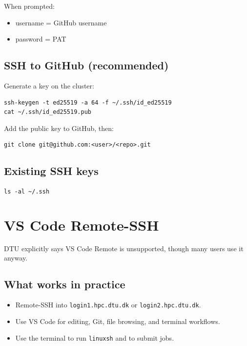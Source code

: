 \documentclass[11pt,a4paper]{article}
\begin{document}
When prompted:
\begin{itemize}[leftmargin=1.5em]
  \item username = GitHub username
  \item password = PAT
\end{itemize}

\subsection{SSH to GitHub (recommended)}

Generate a key on the cluster:

\begin{lstlisting}[style=shell]
ssh-keygen -t ed25519 -a 64 -f ~/.ssh/id_ed25519
cat ~/.ssh/id_ed25519.pub
\end{lstlisting}

Add the public key to GitHub, then:

\begin{lstlisting}[style=shell]
git clone git@github.com:<user>/<repo>.git
\end{lstlisting}

\subsection{Existing SSH keys}

\begin{lstlisting}[style=shell]
ls -al ~/.ssh
\end{lstlisting}

\section{VS Code Remote-SSH}

DTU explicitly says VS Code Remote is unsupported, though many users use it anyway.

\subsection{What works in practice}

\begin{itemize}[leftmargin=1.5em]
  \item Remote-SSH into \texttt{login1.hpc.dtu.dk} or \texttt{login2.hpc.dtu.dk}.
  \item Use VS Code for editing, Git, file browsing, and terminal workflows.
  \item Use the terminal to run \texttt{linuxsh} and to submit jobs.
\end{itemize}
\end{document}
